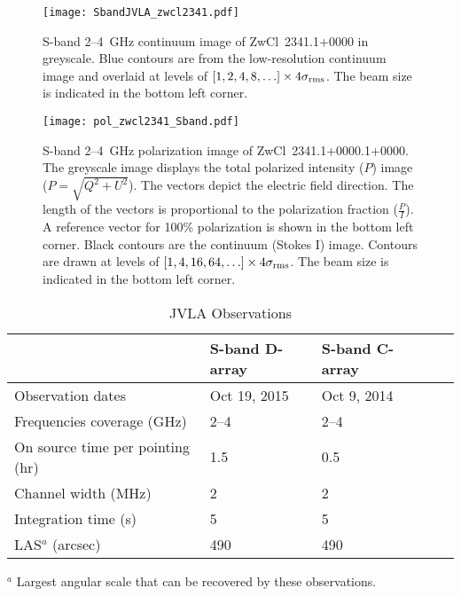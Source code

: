 \documentclass[onecolumn]{aastex}
\begin{document}
\begin{figure}
\texttt{[image: SbandJVLA\_zwcl2341.pdf]}
\caption{S-band 2--4~GHz continuum image of ZwCl~2341.1+0000 in greyscale. Blue contours are from the low-resolution continuum image and overlaid at levels of $[1,2,4,8, \ldots] \times 4\sigma_{\rm{rms}}$. The beam size is indicated in the bottom left corner.\label{fig2}}
\end{figure}

\begin{figure} 
\texttt{[image: pol\_zwcl2341\_Sband.pdf]} 
\caption{S-band 2--4~GHz polarization image of ZwCl~2341.1+0000.1+0000. The greyscale image displays the total polarized intensity ($P$) image ($P = \sqrt{Q^2 + U^2}$). The vectors depict the electric field direction. The length of the vectors is proportional to the polarization fraction ($\frac{P}{I}$). A reference vector for 100\% polarization is shown in the bottom left corner.
Black contours are the continuum (Stokes I) image. Contours are drawn at levels of $[1,4,16, 64, \ldots] \times 4\sigma_{\rm{rms}}$. The beam size is indicated in the bottom left corner.\label{fig3}}
\end{figure}

\begin{table}
\begin{center}
\caption{JVLA Observations}
\begin{tabular}{lllll}
&S-band D-array & S-band C-array & \\
\hline
\hline
Observation dates &    Oct 19, 2015 &  Oct 9, 2014 \\
Frequencies coverage (GHz)      &  2--4 & 2--4 & \\
On source time per pointing  (hr)   & 1.5 & 0.5    \\
Channel width (MHz) & 2 &  2  \\
Integration time (s)     & 5 & 5 \\
LAS$^{a}$ (arcsec)           &  490 & 490 \\
\hline
\end{tabular}
\label{tab:jvlaobs}
\end{center}
$^{a}$ Largest angular scale that can be recovered by these observations. \\
\end{table}
\end{document}
